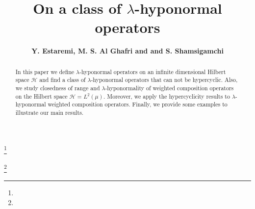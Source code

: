 \documentclass{amsart}
\theoremstyle{definition}\newtheorem{defn}[thm]{Definition}
\theoremstyle{remark}
\numberwithin{equation}{section}
\begin{document}
\title[]
{On a class of $\lambda$-hyponormal operators}

\author{\sc\bf Y. Estaremi, M. S. Al Ghafri and and S. Shamsigamchi}
\address{\sc Y. Estaremi}
\address{Department of Mathematics, Faculty of Sciences, Golestan University, Gorgan, Iran.}
\address{\sc M. S. Al Ghafri}
\address{Department of Mathematics, University of Technology and Applied Sciences, Rustaq {329},  Oman.}
\address{\sc S. Shamsigamchi}
\address{Department of Mathematics, Payame Noor(PNU) university, Tehran, Iran.}
\address{}
\thanks{}

\thanks{}



\date{}

\dedicatory{}

\commby{}

\begin{abstract}
In this paper we define $\lambda$-hyponormal operators on an infinite dimensional Hilbert space $\mathcal{H}$ and find a class of $\lambda$-hyponormal operators that can not be hypercyclic.  Also, we study closedness of range and $\lambda$-hyponormality of weighted composition operators on the Hilbert space $\mathcal{H}=L^2(\mu)$. Moreover, we apply the hypercyclicity results to $\lambda$-hyponormal weighted composition operators. Finally, we provide some examples to illustrate our main results.

\end{abstract}

\maketitle
\end{document}
